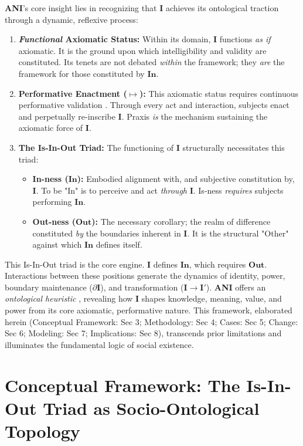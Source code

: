 \documentclass{article}
\newcommand{\ANI}{\textbf{ANI}}             %
\newcommand{\Isness}{\mathbf{I}}            %
\newcommand{\Inness}{\mathbf{In}}           %
\newcommand{\Outness}{\mathbf{Out}}         %
\newcommand{\enactment}{\ensuremath{\mapsto}} %
\newcommand{\boundary}[1]{\ensuremath{\partial #1}} %
\begin{document}
\ANI{}'s core insight lies in recognizing that $\Isness$ achieves its ontological traction through a dynamic, reflexive process:
\begin{enumerate}
    \item \textbf{\textit{Functional} Axiomatic Status:} Within its domain, $\Isness$ functions \textit{as if} axiomatic. It is the ground upon which intelligibility and validity are constituted. Its tenets are not debated \textit{within} the framework; they \textit{are} the framework for those constituted by $\Inness$.
    \item \textbf{Performative Enactment ($\enactment$):} This axiomatic status requires continuous performative validation \citep{Goffman1959}. Through every act and interaction, subjects enact and perpetually re-inscribe $\Isness$. Praxis \textit{is} the mechanism sustaining the axiomatic force of $\Isness$.
    \item \textbf{The Is-In-Out Triad:} The functioning of $\Isness$ structurally necessitates this triad:
    \begin{itemize}
        \item \textbf{In-ness ($\Inness$):} Embodied alignment with, and subjective constitution by, $\Isness$. To be "In" is to perceive and act \textit{through} $\Isness$. Is-ness \textit{requires} subjects performing $\Inness$.
        \item \textbf{Out-ness ($\Outness$):} The necessary corollary; the realm of difference constituted \textit{by} the boundaries inherent in $\Isness$. It is the structural "Other" against which $\Inness$ defines itself.
    \end{itemize}
\end{enumerate}

This Is-In-Out triad is the core engine. $\Isness$ defines $\Inness$, which requires $\Outness$. Interactions between these positions generate the dynamics of identity, power, boundary maintenance ($\boundary{\Isness}$), and transformation ($\Isness \rightarrow \Isness'$). \ANI{} offers an \textit{ontological heuristic} \citep{Searle1995}, revealing how $\Isness$ shapes knowledge, meaning, value, and power from its core axiomatic, performative nature. This framework, elaborated herein (Conceptual Framework: Sec 3; Methodology: Sec 4; Cases: Sec 5; Change: Sec 6; Modeling: Sec 7; Implications: Sec 8), transcends prior limitations and illuminates the fundamental logic of social existence.

\section{Conceptual Framework: The Is-In-Out Triad as Socio-Ontological Topology}
\end{document}
